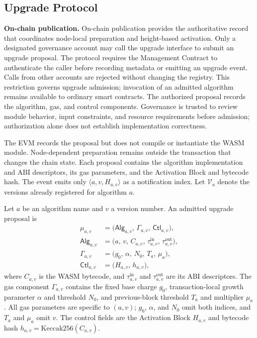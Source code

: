 \documentclass[runningheads]{llncs}
\begin{document}
\subsection{Upgrade Protocol}\label{sec3.2}
\noindent\textbf{On-chain publication.} On-chain publication provides the authoritative record that coordinates node-local preparation and height-based activation. Only a designated governance account may call the upgrade interface to submit an upgrade proposal. The protocol requires the Management Contract to authenticate the caller before recording metadata or emitting an upgrade event. Calls from other accounts are rejected without changing the registry. This restriction governs upgrade admission; invocation of an admitted algorithm remains available to ordinary smart contracts. The authorized proposal records the algorithm, gas, and control components. Governance is trusted to review module behavior, input constraints, and resource requirements before admission; authorization alone does not establish implementation correctness.

The EVM records the proposal but does not compile or instantiate the WASM module. Node-dependent preparation remains outside the transaction that changes the chain state. Each proposal contains the algorithm implementation and ABI descriptors, its gas parameters, and the Activation Block and bytecode hash. The event emits only $\langle a,v,H_{a,v}\rangle$ as a notification index. Let $\mathcal{V}_{a}$ denote the versions already registered for algorithm $a$.

\begin{definition}
\label{def:version-metadata}
Let $a$ be an algorithm name and $v$ a version number. An admitted upgrade proposal is
\begin{equation}
\begin{aligned}
\mu_{a,v}&=\bigl(\mathsf{Alg}_{a,v},\,\Gamma_{a,v},\,\mathsf{Ctl}_{a,v}\bigr),\\
\mathsf{Alg}_{a,v}&=\bigl(a,\,v,\,C_{a,v},\,\tau^{\mathrm{in}}_{a,v},\,\tau^{\mathrm{out}}_{a,v}\bigr),\\
\Gamma_{a,v}&=\bigl(g_0,\,\alpha,\,N_0,\,T_{a},\,\mu_{a}\bigr),\\
\mathsf{Ctl}_{a,v}&=\bigl(H_{a,v},\,h_{a,v}\bigr),
\end{aligned}
\label{eq:version-metadata}
\end{equation}
where $C_{a,v}$ is the WASM bytecode, and $\tau^{\mathrm{in}}_{a,v}$ and $\tau^{\mathrm{out}}_{a,v}$ are its ABI descriptors. The gas component $\Gamma_{a,v}$ contains the fixed base charge $g_0$, transaction-local growth parameter $\alpha$ and threshold $N_0$, and previous-block threshold $T_a$ and multiplier $\mu_a$. All gas parameters are specific to $(a,v)$; $g_0$, $\alpha$, and $N_0$ omit both indices, and $T_a$ and $\mu_a$ omit $v$. The control fields are the Activation Block $H_{a,v}$ and bytecode hash $h_{a,v}=\mathrm{Keccak256}(C_{a,v})$.
\end{definition}
\end{document}

